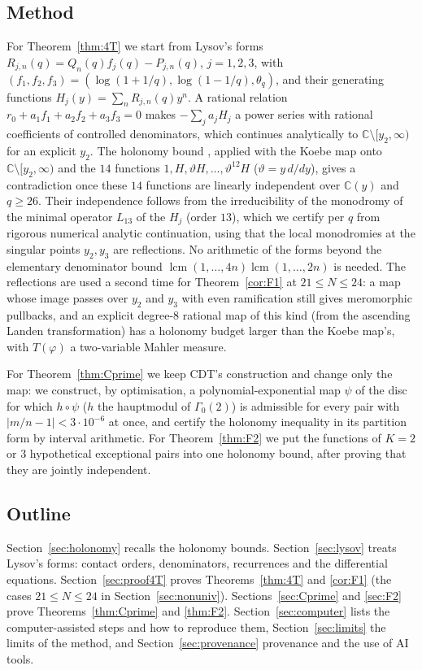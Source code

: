\documentclass[11pt]{amsart}
\theoremstyle{definition}
\theoremstyle{remark}
\numberwithin{equation}{section}
\newcommand{\CC}{\mathbb{C}}
\newcommand{\lcm}{\operatorname{lcm}}
\begin{document}
\subsection{Method}
For Theorem~\ref{thm:4T} we start from Lysov's forms $R_{j,n}(q)=Q_n(q)f_j(q)-P_{j,n}(q)$, $j=1,2,3$, with
$(f_1,f_2,f_3)=(\log(1+1/q),\log(1-1/q),\theta_q)$, and their generating functions $H_j(y)=\sum_nR_{j,n}(q)y^n$. A
rational relation $r_0+a_1f_1+a_2f_2+a_3f_3=0$ makes $-\sum_ja_jH_j$ a power series with rational coefficients of
controlled denominators, which continues analytically to $\CC\setminus[y_2,\infty)$ for an explicit $y_2$. The
holonomy bound \cite[Thm.~7.0.1]{CDT}, applied with the Koebe map onto $\CC\setminus[y_2,\infty)$ and the $14$ functions
$1,H,\vartheta H,\dots,\vartheta^{12}H$ ($\vartheta=y\,d/dy$), gives a contradiction once these $14$ functions are
linearly independent over $\CC(y)$ and $q\ge26$. Their independence follows from the irreducibility of the monodromy of
the minimal operator $L_{13}$ of the $H_j$ (order $13$), which we certify per $q$ from rigorous numerical analytic
continuation, using that the local monodromies at the singular points $y_2,y_3$ are reflections. No arithmetic of the
forms beyond the elementary denominator bound $\lcm(1,\dots,4n)\lcm(1,\dots,2n)$ is needed. The reflections are used a
second time for Theorem~\ref{cor:F1} at $21\le N\le24$: a map whose image passes over $y_2$ and $y_3$ with even
ramification still gives meromorphic pullbacks, and an explicit degree-$8$ rational map of this kind (from the ascending
Landen transformation) has a holonomy budget larger than the Koebe map's, with $T(\varphi)$ a two-variable Mahler measure.

For Theorem~\ref{thm:Cprime} we keep CDT's construction and change only the map: we construct, by optimisation, a
polynomial-exponential map $\psi$ of the disc for which $h\circ\psi$ ($h$ the hauptmodul of $\Gamma_0(2)$) is admissible
for every pair with $|m/n-1|<3\cdot10^{-6}$ at once, and certify the holonomy inequality in its partition form
\cite[Thm.~6.0.2]{CDT} by interval arithmetic. For Theorem~\ref{thm:F2} we put the functions of $K=2$ or $3$
hypothetical exceptional pairs into one holonomy bound, after proving that they are jointly independent.

\subsection*{Outline}
Section~\ref{sec:holonomy} recalls the holonomy bounds. Section~\ref{sec:lysov} treats Lysov's forms: contact orders,
denominators, recurrences and the differential equations. Section~\ref{sec:proof4T} proves Theorems~\ref{thm:4T} and
\ref{cor:F1} (the cases $21\le N\le24$ in Section~\ref{sec:nonuniv}). Sections~\ref{sec:Cprime} and \ref{sec:F2} prove Theorems~\ref{thm:Cprime} and \ref{thm:F2}.
Section~\ref{sec:computer} lists the computer-assisted steps and how to reproduce them, Section~\ref{sec:limits}
the limits of the method, and Section~\ref{sec:provenance} provenance and the use of AI tools.
\end{document}
